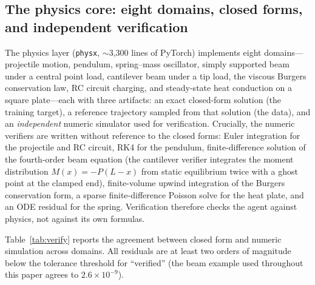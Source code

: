 \documentclass[11pt,a4paper]{article}
\begin{document}
\subsection{The physics core: eight domains, closed forms, and independent verification}

The physics layer (\texttt{physx}, $\sim$3,300 lines of PyTorch) implements
eight domains---projectile motion, pendulum, spring--mass oscillator, simply
supported beam under a central point load, cantilever beam under a tip
load, the viscous Burgers conservation law, RC circuit charging, and
steady-state heat conduction on a square plate---each
with three artifacts: an exact closed-form solution (the training target), a
reference trajectory sampled from that solution (the data), and an
\emph{independent} numeric simulator used for verification. Crucially, the
numeric verifiers are written without reference to the closed forms: Euler
integration for the projectile and RC circuit, RK4 for the pendulum,
finite-difference solution of the fourth-order beam equation (the
cantilever verifier integrates the moment distribution $M(x)=-P(L-x)$
from static equilibrium twice with a ghost point at the clamped end),
finite-volume upwind integration of the Burgers conservation form, a
sparse finite-difference Poisson solve for the heat plate, and an
ODE
residual for the spring. Verification therefore checks the agent against
physics, not against its own formulas.

Table~\ref{tab:verify} reports the agreement between closed form and numeric
simulation across domains. All residuals are at least two orders of
magnitude below the tolerance threshold for ``verified'' (the beam example
used throughout this paper agrees to $2.6\times10^{-9}$).
\end{document}
